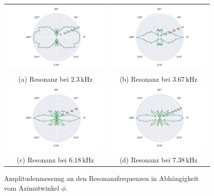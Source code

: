 \begin{figure}
    \centering
    \begin{tabular}{cc}
      \includegraphics[width=65mm]{Daten/Wasserstoff/peak0.pdf} &   \includegraphics[width=65mm]{Daten/Wasserstoff/peak1.pdf} \\
    (a) Resonanz bei $2.3 \,\si{\kilo\hertz} $& (b) Resonanz bei $3.67 \,\si{\kilo\hertz}$ \\[6pt]
    \includegraphics[width=65mm]{Daten/Wasserstoff/peak2.pdf} &   \includegraphics[width=65mm]{Daten/Wasserstoff/peak3.pdf} \\
    (c) Resonanz bei $6.18 \,\si{\kilo\hertz}$ & (d) Resonanz bei $7.38 \,\si{\kilo\hertz}$ \\[6pt]
    \end{tabular}
    \caption{Amplitudenmessung an den Resonanzfrequenzen in Abhängigkeit vom Azimutwinkel $\phi$. } 
    \label{fig:hpeaks}
\end{figure}